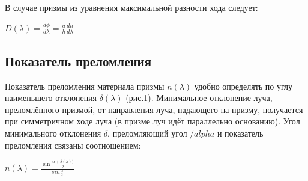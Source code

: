 В случае призмы из уравнения максимальной разности хода следует:
\begin{center}
	{\Large $D(\lambda) = \frac{d\phi}{d\lambda} = \frac{a}{h} \frac{dn}{d\lambda}$}
\end{center}

\subsection*{Показатель преломления}
Показатель преломления материала призмы $n(\lambda)$ удобно определять по углу наименьшего отклонения $\delta(\lambda)$ (рис.1). Минимальное отклонение луча, преломлённого призмой, от направления луча, падающего на призму, получается при симметричном ходе луча (в призме луч идёт параллельно основанию). Угол минимального отклонения $\delta$, преломляющий угол $/alpha$ и показатель преломления связаны соотношением:

\begin{center}
	{\Large $n(\lambda) = \frac{\sin\frac{\alpha + \delta(\lambda))}{2}}{sin\frac{\alpha}{2}}$}
\end{center}





